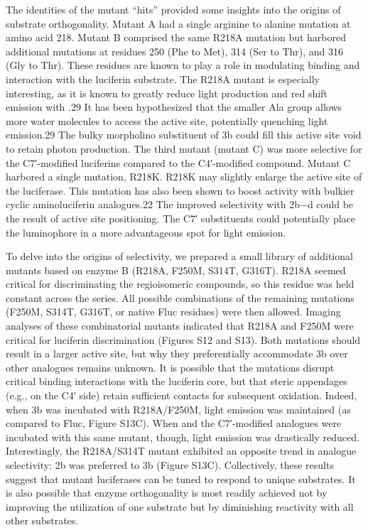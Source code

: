 The identities
of the mutant “hits” provided some insights into the origins of
substrate orthogonality. Mutant A had a single arginine to
alanine mutation at amino acid 218. Mutant B comprised the
same R218A mutation but harbored additional mutations at
residues 250 (Phe to Met), 314 (Ser to Thr), and 316 (Gly to
Thr). These residues are known to play a role in modulating
binding and interaction with the luciferin substrate. The R218A
mutant is especially interesting, as it is known to greatly reduce
light production and red shift emission with \dluciferin{}.29 It has
been hypothesized that the smaller Ala group allows more
water molecules to access the active site, potentially quenching
light emission.29 The bulky morpholino substituent of 3b could
fill this active site void to retain photon production. The third
mutant (mutant C) was more selective for the C7′-modified
luciferins compared to the C4′-modified compound. Mutant C
harbored a single mutation, R218K. R218K may slightly enlarge
the active site of the luciferase. This mutation has also been
shown to boost activity with bulkier cyclic aminoluciferin
analogues.22 The improved selectivity with 2b−d could be the
result of active site positioning. The C7′ substituents could
potentially place the luminophore in a more advantageous spot
for light emission.
\par
To delve into the origins of selectivity, we prepared a small
library of additional mutants based on enzyme B (R218A,
F250M, S314T, G316T). R218A seemed critical for discriminating
the regioisomeric compounds, so this residue was held
constant across the series. All possible combinations of the
remaining mutations (F250M, S314T, G316T, or native Fluc
residues) were then allowed. Imaging analyses of these
combinatorial mutants indicated that R218A and F250M
were critical for luciferin discrimination (Figures S12 and
S13). Both mutations should result in a larger active site, but
why they preferentially accommodate 3b over other analogues
remains unknown. It is possible that the mutations disrupt
critical binding interactions with the luciferin core, but that
steric appendages (e.g., on the C4′ side) retain sufficient
contacts for subsequent oxidation. Indeed, when 3b was
incubated with R218A/F250M, light emission was maintained
(as compared to Fluc, Figure S13C). When \dluciferin{} and the
C7′-modified analogues were incubated with this same mutant,
though, light emission was drastically reduced. Interestingly, the
R218A/S314T mutant exhibited an opposite trend in analogue
selectivity: 2b was preferred to 3b (Figure S13C). Collectively,
these results suggest that mutant luciferases can be tuned to
respond to unique substrates. It is also possible that enzyme
orthogonality is most readily achieved not by improving the
utilization of one substrate but by diminishing reactivity with all
other substrates.


